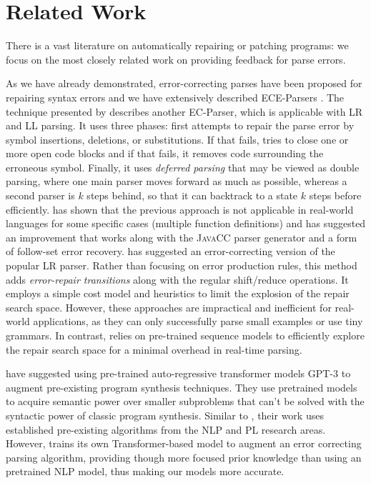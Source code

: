 \section{Related Work}
\label{sec:related-work}

There is a vast literature on automatically repairing or patching programs:
we focus on the most closely related work on providing feedback for parse
errors.

%
As we have already demonstrated, error-correcting parses have been proposed for
repairing syntax errors and we have extensively described ECE-Parsers
\citep{Aho_1972}. The technique presented by \citep{Burke1987} describes another
EC-Parser, which is applicable with LR and LL parsing. It uses three phases:
first attempts to repair the parse error by symbol insertions, deletions, or
substitutions. If that fails, tries to close one or more open code blocks and if
that fails, it removes code surrounding the erroneous symbol. Finally, it uses
\emph{deferred parsing} that may be viewed as double parsing, where one main
parser moves forward as much as possible, whereas a second parser is $k$ steps
behind, so that it can backtrack to a state $k$ steps before efficiently.
\citep{VanDerSpek_2005} has shown that the previous approach is not applicable
in real-world languages for some specific cases (\eg multiple function
definitions) and has suggested an improvement that works along with the
\textsc{JavaCC} parser generator and a form of follow-set error recovery.
\citep{Corchuelo2002} has suggested an error-correcting version of the popular
LR parser. Rather than focusing on error production rules, this method adds
\emph{error-repair transitions} along with the regular shift/reduce operations.
It employs a simple cost model and heuristics to limit the explosion of the
repair search space. However, these approaches are impractical and inefficient
for real-world applications, as they can only successfully parse small examples
or use tiny grammars. In contrast, \toolname relies on pre-trained sequence
models to efficiently explore the repair search space for a minimal overhead in
real-time parsing.

%
\citep{Rahmani2021, Verbruggen2021} have suggested using pre-trained
auto-regressive transformer models \ie \textsc{GPT-3} \citep{GPT2020} to augment
pre-existing program synthesis techniques. They use pretrained models to acquire
semantic power over smaller subproblems that can't be solved with the syntactic
power of classic program synthesis. Similar to \toolname, their work uses
established pre-existing algorithms from the NLP and PL research areas. However,
\toolname trains its own Transformer-based model to augment an error correcting
parsing algorithm, providing though more focused prior knowledge than using an
pretrained NLP model, thus making our models more accurate.


